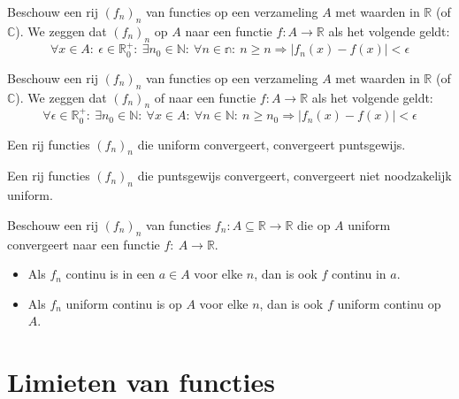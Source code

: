 \documentclass[main.tex]{subfiles}
\begin{document}
\begin{de}
  Beschouw een rij $(f_{n})_{n}$ van functies op een verzameling $A$ met waarden in $\mathbb{R}$ (of $\mathbb{C}$).
  We zeggen dat $(f_{n})_{n}$  op $A$ naar een functie $f: A \rightarrow \mathbb{R}$ als het volgende geldt:
  \[ \forall x\in A:\ \epsilon \in \mathbb{R}_{0}^{+}:\ \exists n_{0}\in \mathbb{N}:\ \forall n\in \mathbb{n}:\ n \ge n \Rightarrow |f_{n}(x)-f(x)| < \epsilon \]
\end{de}

\begin{de}
  Beschouw een rij $(f_{n})_{n}$ van functies op een verzameling $A$ met waarden in $\mathbb{R}$ (of $\mathbb{C}$).
  We zeggen dat $(f_{n})_{n}$  of  naar een functie $f: A \rightarrow \mathbb{R}$ als het volgende geldt:
  \[ \forall \epsilon \in \mathbb{R}_{0}^{+}:\ \exists n_{0} \in \mathbb{N}:\ \forall x \in A:\ \forall n\in \mathbb{N}:\ n \ge n_{0} \Rightarrow |f_{n}(x)-f(x)| < \epsilon \]
\end{de}

\begin{st}
  Een rij functies $(f_{n})_{n}$ die uniform convergeert, convergeert puntsgewijs.
\end{st}

\begin{tvb}
  Een rij functies $(f_{n})_{n}$ die puntsgewijs convergeert, convergeert niet noodzakelijk uniform.
\end{tvb}

\begin{st}
  Beschouw een rij $(f_{n})_{n}$ van functies $f_{n}: A \subseteq \mathbb{R} \rightarrow \mathbb{R}$ die op $A$ uniform convergeert naar een functie $f:\ A \rightarrow \mathbb{R}$.
  \begin{itemize}
  \item Als $f_{n}$ continu is in een $a\in A$ voor elke $n$, dan is ook $f$ continu in $a$.
  \item Als $f_{n}$ uniform continu is op $A$ voor elke $n$, dan is ook $f$ uniform continu op $A$. 
  \end{itemize}

\end{st}

\section{Limieten van functies}
\label{sec:limi-van-funct}
\end{document}
